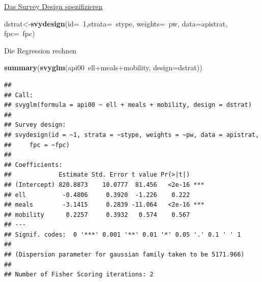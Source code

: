 \documentclass[ignorenonframetext,]{beamer}
\newenvironment{Shaded}{}{}
\newcommand{\KeywordTok}[1]{\textcolor[rgb]{0.00,0.44,0.13}{\textbf{{#1}}}}
\newcommand{\DataTypeTok}[1]{\textcolor[rgb]{0.56,0.13,0.00}{{#1}}}
\newcommand{\DecValTok}[1]{\textcolor[rgb]{0.25,0.63,0.44}{{#1}}}
\newcommand{\NormalTok}[1]{{#1}}
\begin{document}
\begin{frame}[fragile]{\href{https://www.r-bloggers.com/linear-models-with-weighted-observations/}{Das
Survey Design spezifizieren}}

\begin{Shaded}
\begin{Highlighting}[]
\NormalTok{dstrat<-}\KeywordTok{svydesign}\NormalTok{(}\DataTypeTok{id=}\NormalTok{~}\DecValTok{1}\NormalTok{,}\DataTypeTok{strata=}\NormalTok{~stype, }\DataTypeTok{weights=}\NormalTok{~pw, }
                  \DataTypeTok{data=}\NormalTok{apistrat, }\DataTypeTok{fpc=}\NormalTok{~fpc)}
\end{Highlighting}
\end{Shaded}

\begin{block}{Die Regression rechnen}

\begin{Shaded}
\begin{Highlighting}[]
\KeywordTok{summary}\NormalTok{(}\KeywordTok{svyglm}\NormalTok{(api00~ell+meals+mobility, }
               \DataTypeTok{design=}\NormalTok{dstrat))}
\end{Highlighting}
\end{Shaded}

\begin{verbatim}
## 
## Call:
## svyglm(formula = api00 ~ ell + meals + mobility, design = dstrat)
## 
## Survey design:
## svydesign(id = ~1, strata = ~stype, weights = ~pw, data = apistrat, 
##     fpc = ~fpc)
## 
## Coefficients:
##             Estimate Std. Error t value Pr(>|t|)    
## (Intercept) 820.8873    10.0777  81.456   <2e-16 ***
## ell          -0.4806     0.3920  -1.226    0.222    
## meals        -3.1415     0.2839 -11.064   <2e-16 ***
## mobility      0.2257     0.3932   0.574    0.567    
## ---
## Signif. codes:  0 '***' 0.001 '**' 0.01 '*' 0.05 '.' 0.1 ' ' 1
## 
## (Dispersion parameter for gaussian family taken to be 5171.966)
## 
## Number of Fisher Scoring iterations: 2
\end{verbatim}

\end{block}

\end{frame}
\end{document}
